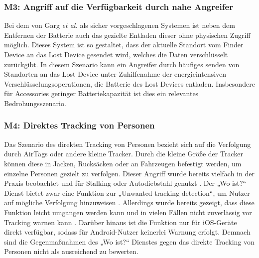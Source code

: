 \subsubsection[Szenario M3]{M3: Angriff auf die Verfügbarkeit durch nahe Angreifer}
\label{missbrauch:3}
Bei dem von Garg \textit{et al.} \cite{Garg_Secure_Tracker} als sicher vorgeschlagenen Systemen ist neben dem Entfernen der Batterie auch das gezielte Entladen dieser ohne physischen Zugriff möglich.
Dieses System ist so gestaltet, dass der aktuelle Standort vom Finder Device an das Lost Device gesendet wird, welches die Daten verschlüsselt zurückgibt.
In diesem Szenario kann ein Angreifer durch häufiges senden von Standorten an das Lost Device unter Zuhilfenahme der energieintensiven Verschlüsselungsoperationen, die Batterie des Lost Devices entladen.
Insbesondere für Accessories geringer Batteriekapazität ist dies ein relevantes Bedrohungsszenario.

\subsubsection[Szenario M4]{M4: Direktes Tracking von Personen}
\label{missbrauch:4}
Das Szenario des direkten Tracking von Personen bezieht sich auf die Verfolgung durch AirTags oder andere kleine Tracker.
Durch die kleine Größe der Tracker können diese in Jacken, Rucksäcken oder an Fahrzeugen befestigt werden, um einzelne Personen gezielt zu verfolgen.
Dieser Angriff wurde bereits vielfach in der Praxis beobachtet und für Stalking oder Autodiebstahl genutzt \cite{NYT_Airtags}.
Der „Wo ist?“ Dienst bietet zwar eine Funktion zur „Unwanted tracking detection“, um Nutzer auf mögliche Verfolgung hinzuweisen \cite{Apple_FindMySpec}.
Allerdings wurde bereits gezeigt, dass diese Funktion leicht umgangen werden kann \cite{Mayberry_Tracking} und in vielen Fällen nicht zuverlässig vor Tracking warnen kann \cite{Heinrich_AirGuard}.
Darüber hinaus ist die Funktion nur für iOS-Geräte direkt verfügbar, sodass für Android-Nutzer keinerlei Warnung erfolgt.
Demnach sind die Gegenmaßnahmen des „Wo ist?“ Dienstes gegen das direkte Tracking von Personen nicht als ausreichend zu bewerten.



